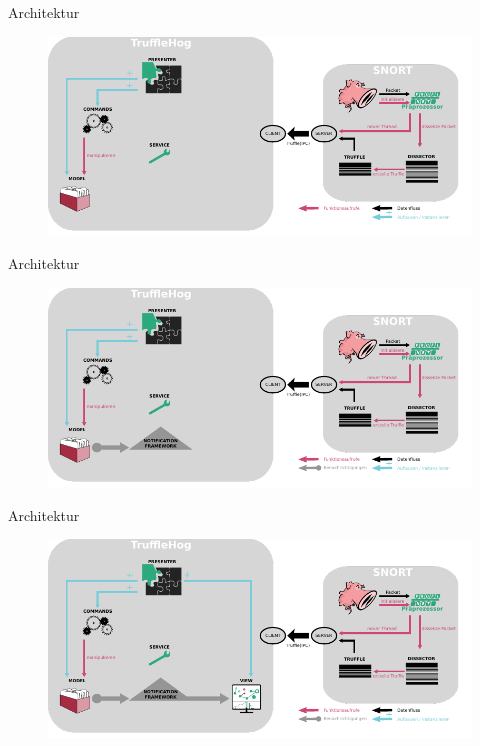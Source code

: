 \documentclass[18pt]{beamer}
\begin{document}
\begin{frame}{Architektur}
    \begin{figure}
    	\centering
    	\includegraphics[width=\textwidth]{./images/12.pdf}
    \end{figure}
\end{frame}

\begin{frame}{Architektur}
    \begin{figure}
    	\centering
    	\includegraphics[width=\textwidth]{./images/13.pdf}
    \end{figure}
\end{frame}

\begin{frame}{Architektur}
    \begin{figure}
    	\centering
    	\includegraphics[width=\textwidth]{./images/14.pdf}
    \end{figure}
\end{frame}
\end{document}
